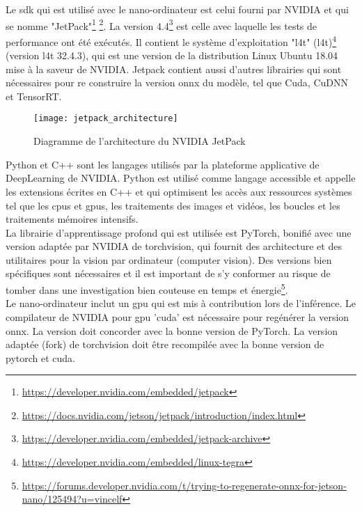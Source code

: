 \noindent Le \acrshort{sdk} qui est utilisé avec le nano-ordinateur est celui fourni par NVIDIA et qui se nomme "JetPack"\footnote{\url{https://developer.nvidia.com/embedded/jetpack}} \footnote{\url{https://docs.nvidia.com/jetson/jetpack/introduction/index.html}}. La version 4.4\footnote{\url{https://developer.nvidia.com/embedded/jetpack-archive}} est celle avec laquelle les tests de performance ont été exécutés. Il contient le système d'exploitation "\acrlong{l4t}" (\acrshort{l4t})\footnote{\url{https://developer.nvidia.com/embedded/linux-tegra}} (version \acrshort{l4t} 32.4.3), qui est une version de la distribution Linux Ubuntu 18.04 mise à la saveur de NVIDIA. Jetpack contient aussi d'autres librairies qui sont nécessaires pour re construire la version \acrshort{onnx} du modèle, tel que Cuda, CuDNN et TensorRT.
\begin{figure}[H]
    \centering
    \texttt{[image: jetpack\_architecture]}
    \caption[Diagramme de l'architecture du NVIDIA JetPack]{Diagramme de l'architecture du NVIDIA JetPack\protect\footnotemark}
    \label{fig:jetpack_architecture}
\end{figure}
\noindent Python et C++ sont les langages utilisés par la plateforme applicative de DeepLearning de NVIDIA. Python est utilisé comme langage accessible et appelle les extensions écrites en C++ et qui optimisent les accès aux ressources systèmes tel que les \acrshort{cpu}s et \acrshort{gpu}s, les traitements des images et vidéos, les boucles et les traitements mémoires intensifs.
\vspace{0.5\baselineskip}
\\
\noindent La librairie d’apprentissage profond qui est utilisée est PyTorch, bonifié avec une version adaptée par NVIDIA de torchvision, qui fournit des architecture et des utilitaires pour la vision par ordinateur (computer vision). Des versions bien spécifiques sont nécessaires et il est important de s'y conformer au risque de tomber dans une investigation bien couteuse en temps et énergie\footnote{\url{https://forums.developer.nvidia.com/t/trying-to-regenerate-onnx-for-jetson-nano/125494?u=vincelf}}.
\vspace{0.5\baselineskip}
\\
\noindent Le nano-ordinateur inclut un \acrshort{gpu} qui est mis à contribution lors de l'inférence. Le compilateur de NVIDIA pour \acrshort{gpu} 'cuda' est nécessaire pour regénérer la version \acrshort{onnx}. La version doit concorder avec la bonne version de PyTorch. La version adaptée (fork) de torchvision doit être recompilée avec la bonne version de pytorch et cuda. 
